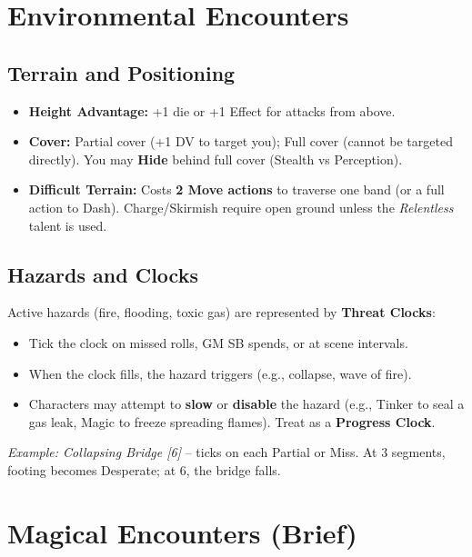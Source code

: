 \section{Environmental Encounters}

\subsection{Terrain and Positioning}
\begin{itemize}[leftmargin=*]
  \item \textbf{Height Advantage:} +1 die or +1 Effect for attacks from above.
  \item \textbf{Cover:} Partial cover (+1 DV to target you); Full cover (cannot be targeted directly). You may \textbf{Hide} behind full cover (Stealth vs Perception).
  \item \textbf{Difficult Terrain:} Costs \textbf{2 Move actions} to traverse one band (or a full action to Dash). Charge/Skirmish require open ground unless the \textit{Relentless} talent is used.
\end{itemize}

\subsection{Hazards and Clocks}
Active hazards (fire, flooding, toxic gas) are represented by \textbf{Threat Clocks}:
\begin{itemize}[leftmargin=*]
  \item Tick the clock on missed rolls, GM SB spends, or at scene intervals.
  \item When the clock fills, the hazard triggers (e.g., collapse, wave of fire).
  \item Characters may attempt to \textbf{slow} or \textbf{disable} the hazard (e.g., Tinker to seal a gas leak, Magic to freeze spreading flames). Treat as a \textbf{Progress Clock}.
\end{itemize}
\textit{Example: Collapsing Bridge [6]} -- ticks on each Partial or Miss. At 3 segments, footing becomes Desperate; at 6, the bridge falls.

\section{Magical Encounters (Brief)}

